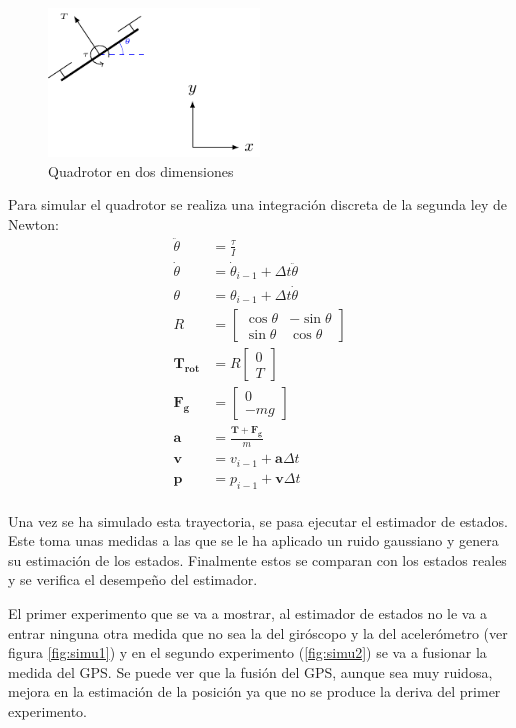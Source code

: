 \begin{figure}
\includegraphics[width=0.5\textwidth]{estimador_px4/tikz/quadrotor_2d}
\caption{Quadrotor en dos dimensiones}
\label{fig:model}
\end{figure}

Para simular el quadrotor se realiza una integración discreta de la segunda ley de Newton:
\begin{align}
        \ddot{\theta} &= \frac{\tau}{I} \\
        \dot{\theta} &= \dot{\theta}_{i-1} + \Delta t \ddot{\theta} \\
        \theta &= \theta_{i-1} + \Delta t \dot{\theta} \\
        R &= 
\begin{bmatrix}
\cos{\theta}& -\sin{\theta}\\
\sin{\theta} & \cos{\theta}
\end{bmatrix}\\
         \bm{T_{rot}}&= R  \begin{bmatrix}0\\ T \end{bmatrix}\\
         \bm{F_g}&= \begin{bmatrix}0\\ -m g \end{bmatrix}\\
         \bm{a}& = \frac{\bm{T}+\bm{F_g}}{m}\\
         \bm{v}& = v_{i-1} + \bm{a}\Delta t  \\
        \bm{p} &= p_{i-1} + \bm{v}\Delta t  \\
\end{align}


Una vez se ha simulado esta trayectoria, se pasa ejecutar el estimador de estados. Este toma unas medidas a las que se le ha aplicado un ruido gaussiano y genera su estimación de los estados. Finalmente estos se comparan con los estados reales y se verifica el desempeño del estimador. 

El primer experimento que se va a mostrar, al estimador de estados no le va a entrar ninguna otra medida que no sea la del giróscopo y la del acelerómetro (ver figura \ref{fig:simu1}) y en el segundo experimento (\ref{fig:simu2}) se va a fusionar la medida del GPS. Se puede ver que la fusión del GPS, aunque sea muy ruidosa, mejora en la estimación de la posición ya que no se produce la deriva del primer experimento. 


